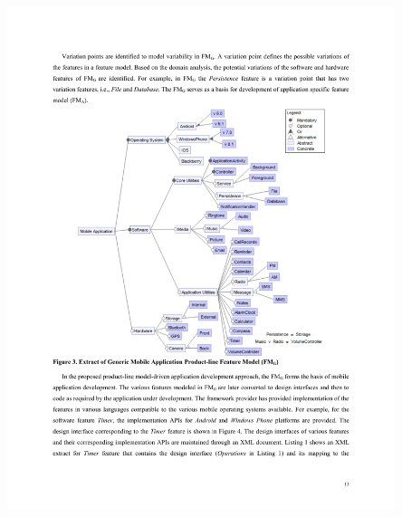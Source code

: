 \documentclass[usenames]{beamer}
\begin{document}
\begin{frame}


\includegraphics[width=0.85\textwidth]{../figures/MobileAppFeatureModel.pdf}

\citet{UsmanEtAl2017}

\end{frame}

\end{document}
